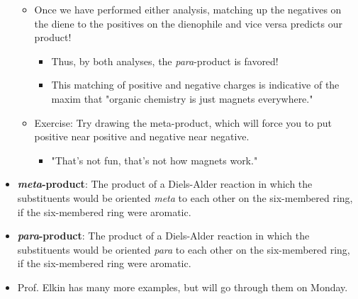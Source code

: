 \documentclass[../notes.tex]{subfiles}
\begin{document}
\begin{itemize}
\begin{itemize}
\begin{itemize}
        \end{itemize}
        \item Once we have performed either analysis, matching up the negatives on the diene to the positives on the dienophile and vice versa predicts our product!
        \begin{itemize}
            \item Thus, by both analyses, the \emph{para}-product is favored!
            \item This matching of positive and negative charges is indicative of the maxim that "organic chemistry is just magnets everywhere."
        \end{itemize}
        \item Exercise: Try drawing the meta-product, which will force you to put positive near positive and negative near negative.
        \begin{itemize}
            \item "That's not fun, that's not how magnets work."
        \end{itemize}
    \end{itemize}
    \item \textbf{\emph{meta}-product}: The product of a Diels-Alder reaction in which the substituents would be oriented \emph{meta} to each other on the six-membered ring, if the six-membered ring were aromatic.
    \item \textbf{\emph{para}-product}: The product of a Diels-Alder reaction in which the substituents would be oriented \emph{para} to each other on the six-membered ring, if the six-membered ring were aromatic.
    \item Prof. Elkin has many more examples, but will go through them on Monday.
\end{itemize}
\end{document}
